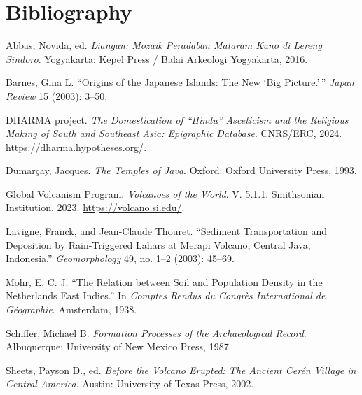 \documentclass[12pt,a4paper]{article}
\begin{document}



\section*{Bibliography}

\noindent Abbas, Novida, ed. \emph{Liangan: Mozaik Peradaban Mataram Kuno di Lereng Sindoro}. Yogyakarta: Kepel Press / Balai Arkeologi Yogyakarta, 2016.

\vspace{0.5em}
\noindent Barnes, Gina L. ``Origins of the Japanese Islands: The New `Big Picture.'\,'' \emph{Japan Review} 15 (2003): 3--50.

\vspace{0.5em}
\noindent DHARMA project. \emph{The Domestication of ``Hindu'' Asceticism and the Religious Making of South and Southeast Asia: Epigraphic Database}. CNRS/ERC, 2024. \url{https://dharma.hypotheses.org/}.

\vspace{0.5em}
\noindent Dumar\c{c}ay, Jacques. \emph{The Temples of Java}. Oxford: Oxford University Press, 1993.

\vspace{0.5em}
\noindent Global Volcanism Program. \emph{Volcanoes of the World}. V. 5.1.1. Smithsonian Institution, 2023. \url{https://volcano.si.edu/}.

\vspace{0.5em}
\noindent Lavigne, Franck, and Jean-Claude Thouret. ``Sediment Transportation and Deposition by Rain-Triggered Lahars at Merapi Volcano, Central Java, Indonesia.'' \emph{Geomorphology} 49, no. 1--2 (2003): 45--69.

\vspace{0.5em}
\noindent Mohr, E. C. J. ``The Relation between Soil and Population Density in the Netherlands East Indies.'' In \emph{Comptes Rendus du Congr\`{e}s International de G\'{e}ographie}. Amsterdam, 1938.

\vspace{0.5em}
\noindent Schiffer, Michael B. \emph{Formation Processes of the Archaeological Record}. Albuquerque: University of New Mexico Press, 1987.

\vspace{0.5em}
\noindent Sheets, Payson D., ed. \emph{Before the Volcano Erupted: The Ancient Cer\'{e}n Village in Central America}. Austin: University of Texas Press, 2002.
\end{document}
